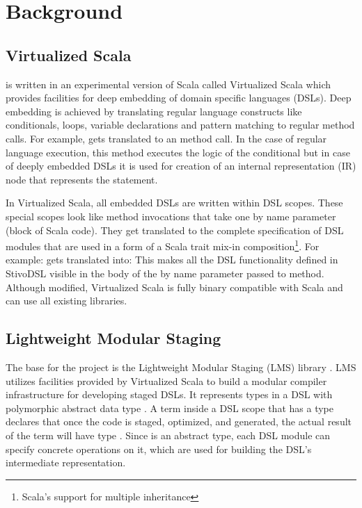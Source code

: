 \section{Background}
\label{sec:background}

\subsection{Virtualized Scala}
\label{subsec:virtualized-scala}
\tool is written in an experimental version of Scala called Virtualized Scala \cite{moors_scala-virtualized_2012} which provides facilities for deep embedding of domain specific languages (DSLs). Deep embedding is achieved by translating regular language constructs like conditionals, loops, variable declarations and pattern matching to regular method calls. For example,  gets translated to an  method call. In the case of regular language execution, this method executes the logic of the conditional but in case of deeply embedded DSLs it is used for creation of an internal representation (IR) node that represents the  statement.  

In Virtualized Scala, all embedded DSLs are written within DSL scopes. These special scopes look like method invocations that take one by name parameter (block of Scala code). They get translated to the complete specification of DSL modules that are used in a form of a Scala trait mix-in composition\footnote[1]{Scala's support for multiple inheritance}. For example: 
 gets translated into:
This makes all the DSL functionality defined in StivoDSL visible in the body of the by name parameter passed to \tool method. 
Although modified, Virtualized Scala is fully binary compatible with Scala and can use all existing libraries.  


\subsection{Lightweight Modular Staging}
\label{subsec:lightweight-modular-staging}

The base for the \tool project is the Lightweight Modular Staging (LMS) library \cite{rompf_lightweight_2010, rompf_lightweight_2012}. LMS utilizes facilities provided by Virtualized Scala to build a modular compiler infrastructure for developing staged DSLs. It represents types in a DSL with polymorphic abstract data type . A term inside a DSL scope that has a type  declares that once the code is staged, optimized, and generated, the actual result of the term will have type . Since  is an abstract type, each DSL module can specify concrete operations on it, which are used for building the DSL's intermediate representation. 

